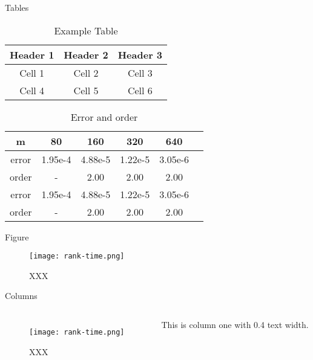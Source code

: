 \documentclass[compress,aspectratio=43]{beamer}
\begin{document}
\begin{frame}{Tables}
    \begin{table}
        \begin{tabular}{|c|c|c|}
            \hline
            Header 1 & Header 2 & Header 3 \\
            \hline
            Cell 1   & Cell 2   & Cell 3   \\
            Cell 4   & Cell 5   & Cell 6   \\
            \hline
        \end{tabular}
        \caption{Example Table}
    \end{table}

    \begin{table}[ht]
        \centering
        \begin{tabular}{c|ccccc}
            \hline
            m     & 80      & 160     & 320     & 640     \\
            \hline
            error & 1.95e-4 & 4.88e-5 & 1.22e-5 & 3.05e-6 \\
            order & -       & 2.00    & 2.00    & 2.00    \\
            \hline
            error & 1.95e-4 & 4.88e-5 & 1.22e-5 & 3.05e-6 \\
            order & -       & 2.00    & 2.00    & 2.00    \\
            \hline
        \end{tabular}
        \caption{Error and order}\label{tab:1}
    \end{table}
\end{frame}

\begin{frame}{Figure}
    \begin{figure}
        \texttt{[image: rank-time.png]}
        \caption{XXX}
    \end{figure}
\end{frame}

\begin{frame}{Columns}
    \begin{columns}
        \begin{figure}
            \texttt{[image: rank-time.png]}
            \caption{XXX}
        \end{figure}
        This is column one with 0.4 text width.
    \end{columns}
\end{frame}
\end{document}
